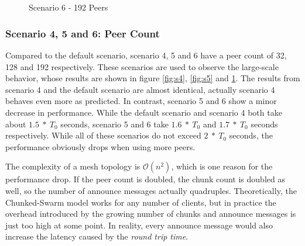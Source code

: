 \pagebreak
\begin{figure}[!ht]
	\begin{center}	
		~ %

	 	~ %

		\caption{Scenario 6 - 192 Peers}
		\label{fig:s6}
	\end{center}
\end{figure}
\vfill

\pagebreak
\subsubsection{Scenario 4, 5 and 6: Peer Count}

Compared to the default scenario, scenario 4, 5 and 6 have a peer count of 32, 128 and 192 respectively. These scenarios are used to observe the large-scale behavior, whose results are shown in figure \ref{fig:s4}, \ref{fig:s5} and \ref{fig:s6}. The results from scenario 4 and the default scenario are almost identical, actually scenario 4 behaves even more as predicted. In contrast, scenario 5 and 6 show a minor decrease in performance. While the default scenario and scenario 4 both take about $1.5\:*\:T_0$ seconds, scenario 5 and 6 take $1.6\:*\:T_0$ and $1.7\:*\:T_0$ seconds respectively. While all of these scenarios do not exceed $2\:*\:T_0$ seconds, the performance obviously drops when using more peers.

The complexity of a mesh topology is ${\mathcal O(n^2)}$, which is one reason for the performance drop. If the peer count is doubled, the chunk count is doubled as well, so the number of announce messages actually quadruples. Theoretically, the Chunked-Swarm model works for any number of clients, but in practice the overhead introduced by the growing number of chunks and announce messages is just too high at some point. In reality, every announce message would also increase the latency caused by the \emph{round trip time}. 

